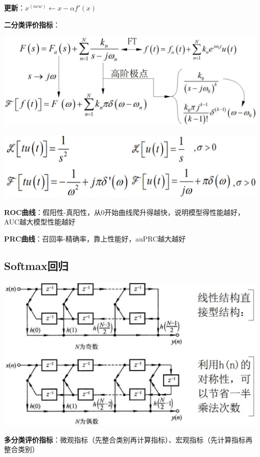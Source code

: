 	\textbf{更新}：$x^{(new)} \leftarrow x-\alpha f'(x)$
	
	\textbf{二分类评价指标}：
	
	\begin{figurehere}
		\centering
		\includegraphics[width=0.6\linewidth]{image01}
		\label{fig:image01}
	\end{figurehere}
	
	\begin{figurehere}
		\centering
		\includegraphics[width=1\linewidth]{image02}
		\label{fig:image02}
	\end{figurehere}
	\textbf{ROC曲线}：假阳性-真阳性，从0开始曲线爬升得越快，说明模型得性能越好，AUC越大模型性能越好
	
	\textbf{PRC曲线}：召回率-精确率，靠上性能好，auPRC越大越好
	
	\subsection*{Softmax回归}
	
	\begin{figurehere}
		\centering
		\includegraphics[width=1\linewidth]{image03}
		\label{fig:image03}
	\end{figurehere}
	\textbf{多分类评价指标}：微观指标（先整合类别再计算指标）、宏观指标（先计算指标再整合类别）
	
